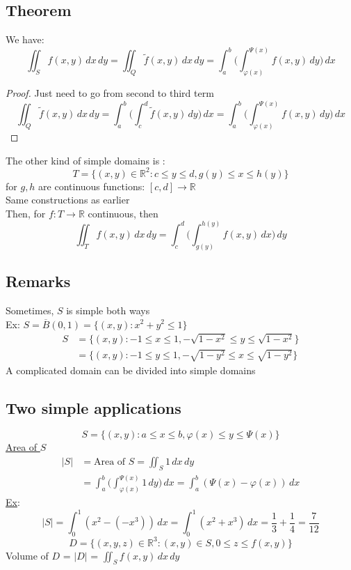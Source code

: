 \documentclass[12pt]{article}
\newcommand*\circled[1]{\tikz[baseline=(char.base)]{
    \node[shape=circle,draw,inner sep=2pt] (char) {#1};}}
\newcommand{\BR}{\mathbb R}
\newcommand{\phii}{\varphi}
\begin{document}
\subsection*{Theorem}
  We have: \\
  \[ \iint_Sf(x,y)\,dx\,dy=\iint_Q\widetilde{f}(x,y)\,dx\,dy=\int_a^b\bigg(\int_{\phii(x)}^{\Psi(x)}f(x,y)\,dy\bigg)\,dx \]
  \begin{proof}
    Just need to go from second to third term \\
    \[ \iint_Q\widetilde{f}(x,y)\,dx\,dy=\int_a^b\bigg(\int_c^d\widetilde{f}(x,y)\,dy\bigg)\,dx=\int_a^b\bigg(\int_{\phii(x)}^{\Psi(x)}f(x,y)\,dy\bigg)\,dx \]
  \end{proof}
  The other kind of simple domains is : \\
  \[ T=\big\{(x,y)\in\BR^2:c\leq y\leq d, g(y)\leq x\leq h(y)\bigg\} \]
  for $g,h$ are continuous functions: $[c,d]\rightarrow\BR$ \\
  Same constructions as earlier \\
  Then, for $f:T\rightarrow\BR$ continuous, then \\
  \[ \iint_Tf(x,y)\,dx\,dy=\int_c^d\bigg(\int_{g(y)}^{h(y)}f(x,y)\,dx\bigg)\,dy \]
\subsection*{Remarks}
  \circled{1} Sometimes, $S$ is simple both ways \\
  Ex: $S=\overline{B}(0,1)=\big\{(x,y):x^2+y^2\leq 1\big\}$
  \begin{align*}
    S & = \big\{(x,y):-1\leq x\leq 1,-\sqrt{1-x^2}\leq y\leq\sqrt{1-x^2}\big\} \\
    & = \big\{(x,y): -1\leq y\leq 1,-\sqrt{1-y^2}\leq x\leq\sqrt{1-y^2}\big\}
  \end{align*}
  \circled{2} A complicated domain can be divided into simple domains
\subsection*{Two simple applications}
  \[ S=\big\{(x,y): a\leq x\leq b, \phii(x)\leq y\leq\Psi(x)\big\} \]
  \underline{Area of $S$} \\
  \begin{align*}
    |S| & =\text{Area of $S$}=\iint_S 1\,dx\,dy \\
    & = \int_a^b\bigg(\int_{\phii(x)}^{\Psi(x)}1\,dy\bigg)\,dx=\int_a^b(\Psi(x)-\phii(x))\,dx
  \end{align*}
  \underline{Ex}:
  \[ |S|=\int_0^1(x^2-(-x^3))\,dx=\int_0^1(x^2+x^3)\,dx=\frac{1}{3}+\frac{1}{4}=\frac{7}{12} \]
  \[ D = \big\{(x,y,z)\in\BR^3:(x,y)\in S, 0\leq z\leq f(x,y)\big\} \]
  Volume of $D$ = $|D|$ = $\iint_Sf(x,y)\,dx\,dy$
\end{document}
